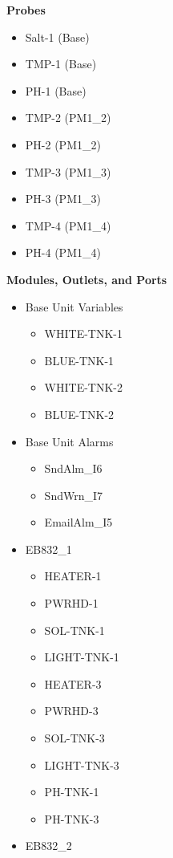 \documentclass[
]{book}
\providecommand{\tightlist}{%
  \setlength{\itemsep}{0pt}\setlength{\parskip}{0pt}}
\begin{document}
\textbf{Probes}

\begin{itemize}
\tightlist
\item
  Salt-1 (Base)
\item
  TMP-1 (Base)
\item
  PH-1 (Base)
\item
  TMP-2 (PM1\_2)
\item
  PH-2 (PM1\_2)
\item
  TMP-3 (PM1\_3)
\item
  PH-3 (PM1\_3)
\item
  TMP-4 (PM1\_4)
\item
  PH-4 (PM1\_4)
\end{itemize}

\textbf{Modules, Outlets, and Ports}

\begin{itemize}
\tightlist
\item
  Base Unit Variables

  \begin{itemize}
  \tightlist
  \item
    WHITE-TNK-1
  \item
    BLUE-TNK-1
  \item
    WHITE-TNK-2
  \item
    BLUE-TNK-2
  \end{itemize}
\item
  Base Unit Alarms

  \begin{itemize}
  \tightlist
  \item
    SndAlm\_I6
  \item
    SndWrn\_I7
  \item
    EmailAlm\_I5
  \end{itemize}
\item
  EB832\_1

  \begin{itemize}
  \tightlist
  \item
    HEATER-1
  \item
    PWRHD-1
  \item
    SOL-TNK-1
  \item
    LIGHT-TNK-1
  \item
    HEATER-3
  \item
    PWRHD-3
  \item
    SOL-TNK-3
  \item
    LIGHT-TNK-3
  \item
    PH-TNK-1
  \item
    PH-TNK-3
  \end{itemize}
\item
  EB832\_2


\end{itemize}
\end{document}
